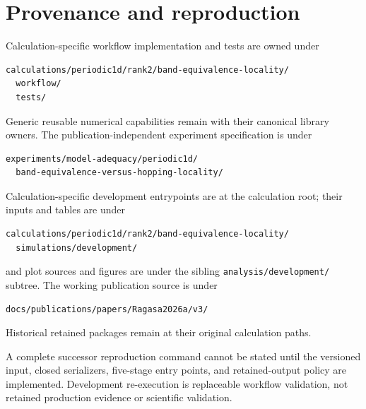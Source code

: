 \section{Provenance and reproduction}

Calculation-specific workflow implementation and tests are owned under
\begin{verbatim}
calculations/periodic1d/rank2/band-equivalence-locality/
  workflow/
  tests/
\end{verbatim}
Generic reusable numerical capabilities remain with their canonical library owners.
The publication-independent experiment specification is under
\begin{verbatim}
experiments/model-adequacy/periodic1d/
  band-equivalence-versus-hopping-locality/
\end{verbatim}
Calculation-specific development entrypoints are at the calculation root; their inputs
and tables are under
\begin{verbatim}
calculations/periodic1d/rank2/band-equivalence-locality/
  simulations/development/
\end{verbatim}
and plot sources and figures are under the sibling \texttt{analysis/development/}
subtree.  The working publication source is under
\begin{verbatim}
docs/publications/papers/Ragasa2026a/v3/
\end{verbatim}
Historical retained packages remain at their original calculation paths.

A complete successor reproduction command cannot be stated until the versioned input,
closed serializers, five-stage entry points, and retained-output policy are implemented.
Development re-execution is replaceable workflow validation, not retained production
evidence or scientific validation.
